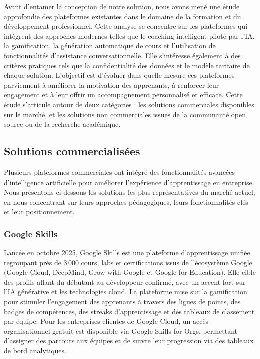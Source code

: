 Avant d'entamer la conception de notre solution, nous avons mené une étude approfondie 
des plateformes existantes dans le domaine de la formation et du développement professionnel. 
Cette analyse se concentre sur les plateformes qui intègrent des approches modernes telles 
que le coaching intelligent piloté par l'IA, la gamification, la génération automatique de 
cours et l'utilisation de fonctionnalités d'assistance conversationnelle. Elle s'intéresse également à des critères 
pratiques tels que la confidentialité des données et le modèle tarifaire de chaque solution. 
L'objectif est d'évaluer dans quelle mesure ces plateformes parviennent à améliorer la 
motivation des apprenants, à renforcer leur engagement et à leur offrir un accompagnement 
personnalisé et efficace. Cette étude s'articule autour de deux catégories : les solutions 
commerciales disponibles sur le marché, et les solutions non commerciales issues de la 
communauté open source ou de la recherche académique.



\subsection{Solutions commercialisées}

Plusieurs plateformes commerciales ont intégré des fonctionnalités avancées d'intelligence 
artificielle pour améliorer l'expérience d'apprentissage en entreprise. Nous présentons 
ci-dessous les solutions les plus représentatives du marché actuel, en nous concentrant 
sur leurs approches pédagogiques, leurs fonctionnalités clés et leur positionnement.



\subsubsection{Google Skills}

Lancée en octobre 2025, Google Skills \cite{googleSkillsFeatures} est une plateforme d'apprentissage 
unifiée regroupant près de 3\,000 cours, labs et certifications issus de l'écosystème Google 
(Google Cloud, DeepMind, Grow with Google et Google for Education). Elle cible des profils 
allant du débutant au développeur confirmé, avec un accent fort sur l'IA générative et les 
technologies cloud. La plateforme mise sur la gamification pour stimuler l'engagement des 
apprenants à travers des ligues de points, des badges de compétences, des streaks 
d'apprentissage et des tableaux de classement par équipe. Pour les entreprises clientes de 
Google Cloud, un accès organisationnel gratuit est disponible via Google Skills for Orgs, 
permettant d'assigner des parcours aux équipes et de suivre leur progression via des 
tableaux de bord analytiques.

